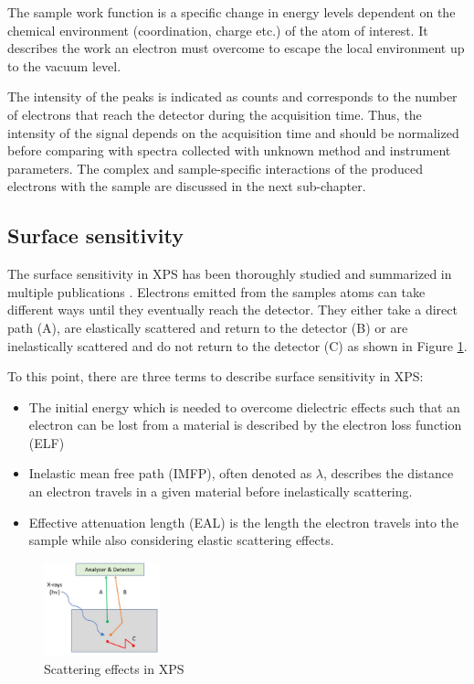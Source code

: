 The sample work function is a specific change in energy levels dependent on the chemical environment (coordination, charge etc.) of the atom of interest. It describes the work an electron must overcome to escape the local environment up to the vacuum level. 


The intensity of the peaks is indicated as counts and corresponds to the number of electrons that reach the detector during the acquisition time. Thus, the intensity of the signal depends on the acquisition time and should be normalized before comparing with spectra collected with unknown method and instrument parameters.
The complex and sample-specific interactions of the produced electrons with the sample are discussed in the next sub-chapter.

\subsection{Surface sensitivity}

The surface sensitivity in XPS has been thoroughly studied and summarized in multiple publications \cite{powell_surface_2009, powell_surface_1999}. Electrons emitted from the samples atoms can take different ways until they eventually reach the detector. They either take a direct path (A), are elastically scattered and return to the detector (B) or are inelastically scattered and do not return to the detector (C) as shown in Figure \ref{fig:scattering}.

To this point, there are three terms to describe surface sensitivity in XPS:
\begin{itemize}
\item The initial energy which is needed to overcome dielectric effects such that an electron can be lost from a material is described by the electron loss function (ELF)
\item Inelastic mean free path (IMFP), often denoted as $\lambda$, describes the distance an electron travels in a given material before inelastically scattering.
\item Effective attenuation length (EAL) is the length the electron travels into the sample while also considering elastic scattering effects.
\end{itemize}

\begin{figure}[H]
    \centering
    \includegraphics[width=0.3\textwidth]{Figures/image6_1.jpg}
    \caption{Scattering effects in XPS \cite{stevie_introduction_2020}}
    \label{fig:scattering}
\end{figure}

